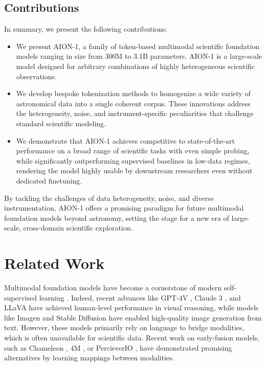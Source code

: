 \documentclass[]{polymathic}
\begin{document}
\subsection{Contributions}
In summary, we present the following contributions:
\begin{itemize}
\item  We present AION-1, a family of token-based multimodal scientific foundation models ranging in size from 300M to 3.1B parameters. AION-1 is a large-scale model designed for arbitrary combinations of highly heterogeneous scientific observations.
\item We develop bespoke tokenization methods to homogenize a wide variety of astronomical data into a single coherent corpus. These innovations address the heterogeneity, noise, and instrument-specific peculiarities that challenge standard scientific modeling.
\item We demonstrate that AION-1 achieves competitive to state-of-the-art performance on a broad range of scientific tasks with even simple probing, while significantly outperforming supervised baselines in low-data regimes, rendering the model highly usable by downstream researchers even without dedicated finetuning.
\end{itemize}
By tackling the challenges of data heterogeneity, noise, and diverse instrumentation, AION-1 offers a promising paradigm for future multimodal foundation models beyond astronomy, setting the stage for a new era of large-scale, cross-domain scientific exploration.   


\section{Related Work}

Multimodal foundation models have become a cornerstone of modern self-supervised learning \citep{achiam2023gpt, team2024gemini, dubey2024llama, liu2023llava, claude, stabilityai2022stable}. Indeed, recent advances like GPT-4V \citep{achiam2023gpt}, Claude 3 \citep{claude}, and LLaVA \citep{liu2023llava} have achieved human-level performance in visual reasoning, while models like Imagen \citep{saharia2022imagen} and Stable Diffusion \citep{stabilityai2022stable} have enabled high-quality image generation from text.
However, these models primarily rely on language to bridge modalities, which is often unavailable for scientific data. Recent work on early-fusion models, such as Chameleon \citep{chameleonteam}, 4M \citep{mizrahi20234m}, or PercieverIO \citep{perceiverio}, have demonstrated promising alternatives by learning mappings between modalities. 
\end{document}
